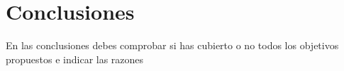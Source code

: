 
\chapter{Conclusiones}
\label{apdo:conclusiones}

En las conclusiones debes comprobar si has cubierto o no todos los objetivos propuestos e indicar las razones